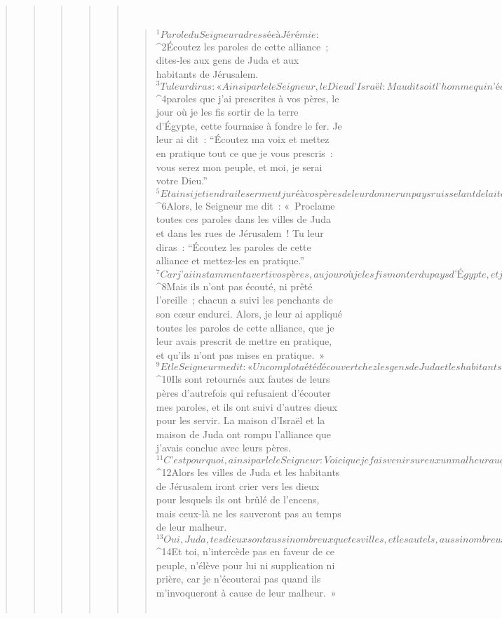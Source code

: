 \begin{verse}
\begin{verse}
\begin{verse}
\begin{verse}
\begin{verse}
         
      \bchapter{}
      \begin{verse}
${}^{1}Parole du Seigneur adressée à Jérémie : 
${}^{2}Écoutez les paroles de cette alliance ; dites-les aux gens de Juda et aux habitants de Jérusalem. 
${}^{3}Tu leur diras : « Ainsi parle le Seigneur, le Dieu d’Israël : Maudit soit l’homme qui n’écoute pas les paroles de cette alliance, 
${}^{4}paroles que j’ai prescrites à vos pères, le jour où je les fis sortir de la terre d’Égypte, cette fournaise à fondre le fer. Je leur ai dit : “Écoutez ma voix et mettez en pratique tout ce que je vous prescris : vous serez mon peuple, et moi, je serai votre Dieu.” 
${}^{5}Et ainsi je tiendrai le serment juré à vos pères de leur donner un pays ruisselant de lait et de miel, comme vous le voyez aujourd’hui. » Et je répondis : « Amen, Seigneur » !
${}^{6}Alors, le Seigneur me dit : « Proclame toutes ces paroles dans les villes de Juda et dans les rues de Jérusalem ! Tu leur diras : “Écoutez les paroles de cette alliance et mettez-les en pratique.” 
${}^{7}Car j’ai instamment averti vos pères, au jour où je les fis monter du pays d’Égypte, et jusqu’à ce jour. Sans cesse, je les ai avertis en disant : “Écoutez ma voix !” 
${}^{8}Mais ils n’ont pas écouté, ni prêté l’oreille ; chacun a suivi les penchants de son cœur endurci. Alors, je leur ai appliqué toutes les paroles de cette alliance, que je leur avais prescrit de mettre en pratique, et qu’ils n’ont pas mises en pratique. »
${}^{9}Et le Seigneur me dit : « Un complot a été découvert chez les gens de Juda et les habitants de Jérusalem. 
${}^{10}Ils sont retournés aux fautes de leurs pères d’autrefois qui refusaient d’écouter mes paroles, et ils ont suivi d’autres dieux pour les servir. La maison d’Israël et la maison de Juda ont rompu l’alliance que j’avais conclue avec leurs pères. 
${}^{11}C’est pourquoi, ainsi parle le Seigneur : Voici que je fais venir sur eux un malheur auquel ils ne pourront échapper. Ils crieront vers moi, et je ne les écouterai pas. 
${}^{12}Alors les villes de Juda et les habitants de Jérusalem iront crier vers les dieux pour lesquels ils ont brûlé de l’encens, mais ceux-là ne les sauveront pas au temps de leur malheur.
${}^{13}Oui, Juda, tes dieux sont aussi nombreux que tes villes, et les autels, aussi nombreux que les rues de Jérusalem, ces autels que vous avez édifiés pour la Honte, où l’on brûle de l’encens au dieu Baal.
${}^{14}Et toi, n’intercède pas en faveur de ce peuple, n’élève pour lui ni supplication ni prière, car je n’écouterai pas quand ils m’invoqueront à cause de leur malheur. »
       

\end{verse}
\end{verse}
\end{verse}
\end{verse}
\end{verse}
\end{verse}
